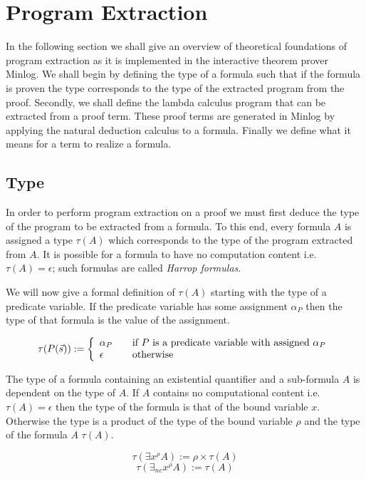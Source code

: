 \section{Program Extraction}

In the following section we shall give an overview of theoretical foundations of program extraction as it is implemented in the interactive theorem prover Minlog. We shall begin by defining the type of a formula such that if the formula is proven the type corresponds to the type of the extracted program from the proof. Secondly, we shall define the lambda calculus program that can be extracted from a proof term. These proof terms are generated in Minlog by applying the natural deduction calculus to a formula.  Finally we define what it means for a term to realize a formula.

\subsection*{Type}
In order to perform program extraction on a proof we must first deduce the
type of the program to be extracted from a formula. To this end, every formula $A$ is assigned a type $\tau(A)$ which corresponds to the type of the program extracted from $A$. It is possible for a formula to have no computation content i.e. $\tau(A) = \epsilon$; such formulas are called \emph{Harrop formulas}.


We will now give a formal definition of $\tau (A)$ starting with the type of a
predicate variable. If the predicate variable has some assignment $\alpha_P$ then the type of that
formula is the value of the assignment.


\[
\tau(P(\vec{s})) := \left\{ 
\begin{array}{l l}
  \alpha_P & \quad \text{if $P$ is a predicate variable with assigned $\alpha_P$}\\
 \epsilon & \quad \text{otherwise}\\
\end{array} \right.
\]

The type of a formula containing an existential quantifier and a sub-formula
$A$ is dependent on the type of $A$. If $A$ contains no computational content
i.e. $\tau(A) = \epsilon$ then the type of the formula is that of the bound
variable $x$. Otherwise the type is a product of the type of the bound
variable $\rho$ and the type of the formula $A$ $\tau (A)$.

\[
\tau(\exists x^{\rho} A) :=  \rho \times \tau (A)
\]
\[
\tau(\exists_{nc} x^{\rho} A) := 
 \tau (A) 
\]

